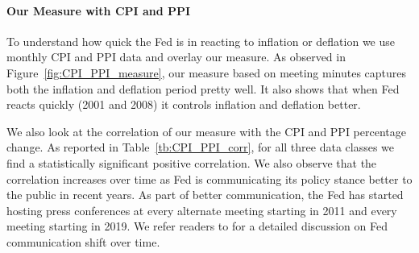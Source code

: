 \documentclass[11pt]{article}
\begin{document}
\paragraph{Our Measure with CPI and PPI} To understand how quick the Fed is in reacting to inflation or deflation we use monthly CPI and PPI data and overlay our measure. As observed in Figure~\ref{fig:CPI_PPI_measure}, our measure based on meeting minutes captures both the inflation and deflation period pretty well. It also shows that when Fed reacts quickly (2001 and 2008) it controls inflation and deflation better. 



We also look at the correlation of our measure with the CPI and PPI percentage change. As reported in Table~\ref{tb:CPI_PPI_corr}, for all three data classes we find a statistically significant positive correlation. We also observe that the correlation increases over time as Fed is communicating its policy stance better to the public in recent years. As part of better communication, the Fed has started hosting press conferences at every alternate meeting starting in 2011 and every meeting starting in 2019. We refer readers to \citet{coibion2022monetary} for a detailed discussion on Fed communication shift over time. 
\end{document}
